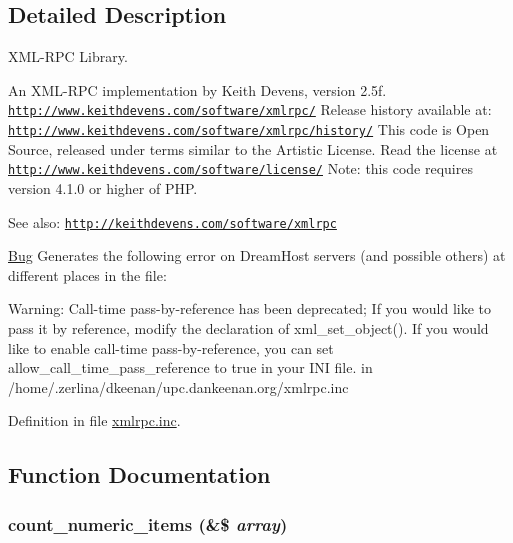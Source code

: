 \subsection{Detailed Description}
XML-RPC Library. 

An XML-RPC implementation by Keith Devens, version 2.5f. \href{http://www.keithdevens.com/software/xmlrpc/}{\tt http://www.keithdevens.com/software/xmlrpc/} Release history available at: \href{http://www.keithdevens.com/software/xmlrpc/history/}{\tt http://www.keithdevens.com/software/xmlrpc/history/} This code is Open Source, released under terms similar to the Artistic License. Read the license at \href{http://www.keithdevens.com/software/license/}{\tt http://www.keithdevens.com/software/license/} Note: this code requires version 4.1.0 or higher of PHP.

\begin{Desc}
\item[See also:]\href{http://keithdevens.com/software/xmlrpc}{\tt http://keithdevens.com/software/xmlrpc}\end{Desc}
\begin{Desc}
\item[\hyperlink{bug__bug000001}{Bug}]Generates the following error on DreamHost servers (and possible others) at different places in the file:\par
 Warning: Call-time pass-by-reference has been deprecated; If you would like to pass it by reference, modify the declaration of xml\_\-set\_\-object(). If you would like to enable call-time pass-by-reference, you can set allow\_\-call\_\-time\_\-pass\_\-reference to true in your INI file. in /home/.zerlina/dkeenan/upc.dankeenan.org/xmlrpc.inc \end{Desc}


Definition in file \hyperlink{xmlrpc_8inc-source}{xmlrpc.inc}.

\subsection{Function Documentation}
\hypertarget{xmlrpc_8inc_88839ba2c5c835c99f55578c65faa401}{
\subsubsection{\setlength{\rightskip}{0pt plus 5cm}count\_\-numeric\_\-items (\&\$ {\em array})}}
\label{xmlrpc_8inc_88839ba2c5c835c99f55578c65faa401}




